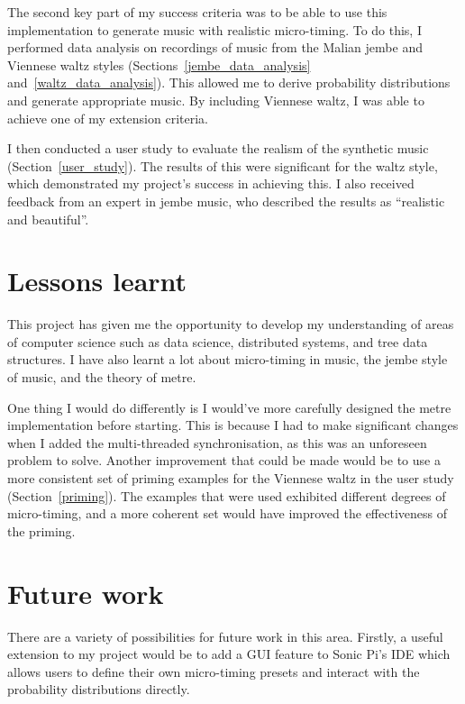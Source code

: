\documentclass[12pt,twoside,openright]{report}
\begin{document}
The second key part of my success criteria was to be able to use this
implementation to generate music with realistic micro-timing. To do this, I
performed data analysis on recordings of music from the Malian jembe and
Viennese waltz styles (Sections~\ref{jembe_data_analysis} and~\ref{waltz_data_analysis}). This allowed me to derive probability distributions and
generate appropriate music. By including Viennese waltz, I was able to achieve
one of my extension criteria.

I then conducted a user study to evaluate the realism of the synthetic music (Section~\ref{user_study}).
The results of this were significant for the waltz style, which demonstrated my
project's success in achieving this. I also received feedback from an expert in
jembe music, who described the results as ``realistic and beautiful''.



\section{Lessons learnt} \label{lessons_learnt}

This project has given me the opportunity to develop my understanding of areas
of computer science such as data science, distributed systems, and tree data
structures. I have also learnt a lot about micro-timing in music, the jembe
style of music, and the theory of metre.

One thing I would do differently is I would've more carefully designed the metre
implementation before starting. This is because I had to make significant
changes when I added the multi-threaded synchronisation, as this was an
unforeseen problem to solve. Another improvement that could be made would be to
use a more consistent set of priming examples for the Viennese waltz in the user
study (Section~\ref{priming}). The examples that were used exhibited different degrees of
micro-timing, and a more coherent set would have improved the effectiveness of
the priming.



\section{Future work} \label{future_work}

There are a variety of possibilities for future work in this area. Firstly, a
useful extension to my project would be to add a GUI feature to Sonic Pi's IDE
which allows users to define their own micro-timing presets and interact with
the probability distributions directly.
\end{document}
